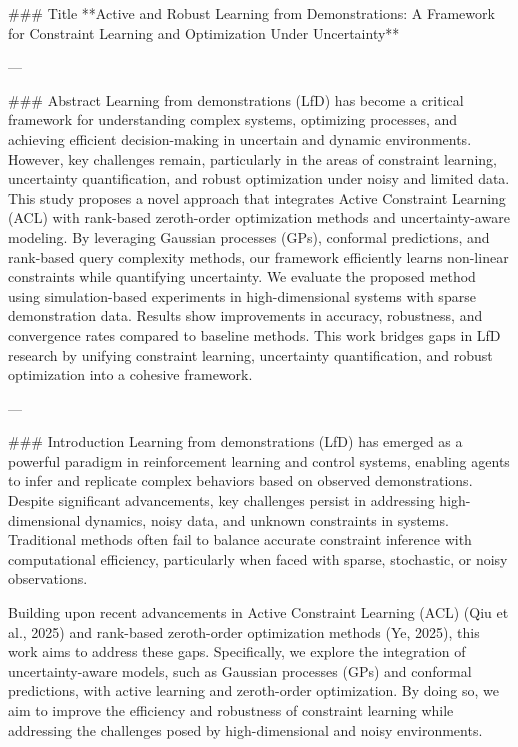 ### Title  
**Active and Robust Learning from Demonstrations: A Framework for Constraint Learning and Optimization Under Uncertainty**

---

### Abstract  
Learning from demonstrations (LfD) has become a critical framework for understanding complex systems, optimizing processes, and achieving efficient decision-making in uncertain and dynamic environments. However, key challenges remain, particularly in the areas of constraint learning, uncertainty quantification, and robust optimization under noisy and limited data. This study proposes a novel approach that integrates Active Constraint Learning (ACL) with rank-based zeroth-order optimization methods and uncertainty-aware modeling. By leveraging Gaussian processes (GPs), conformal predictions, and rank-based query complexity methods, our framework efficiently learns non-linear constraints while quantifying uncertainty. We evaluate the proposed method using simulation-based experiments in high-dimensional systems with sparse demonstration data. Results show improvements in accuracy, robustness, and convergence rates compared to baseline methods. This work bridges gaps in LfD research by unifying constraint learning, uncertainty quantification, and robust optimization into a cohesive framework.  

---

### Introduction  
Learning from demonstrations (LfD) has emerged as a powerful paradigm in reinforcement learning and control systems, enabling agents to infer and replicate complex behaviors based on observed demonstrations. Despite significant advancements, key challenges persist in addressing high-dimensional dynamics, noisy data, and unknown constraints in systems. Traditional methods often fail to balance accurate constraint inference with computational efficiency, particularly when faced with sparse, stochastic, or noisy observations.  

Building upon recent advancements in Active Constraint Learning (ACL) (Qiu et al., 2025) and rank-based zeroth-order optimization methods (Ye, 2025), this work aims to address these gaps. Specifically, we explore the integration of uncertainty-aware models, such as Gaussian processes (GPs) and conformal predictions, with active learning and zeroth-order optimization. By doing so, we aim to improve the efficiency and robustness of constraint learning while addressing the challenges posed by high-dimensional and noisy environments.  


